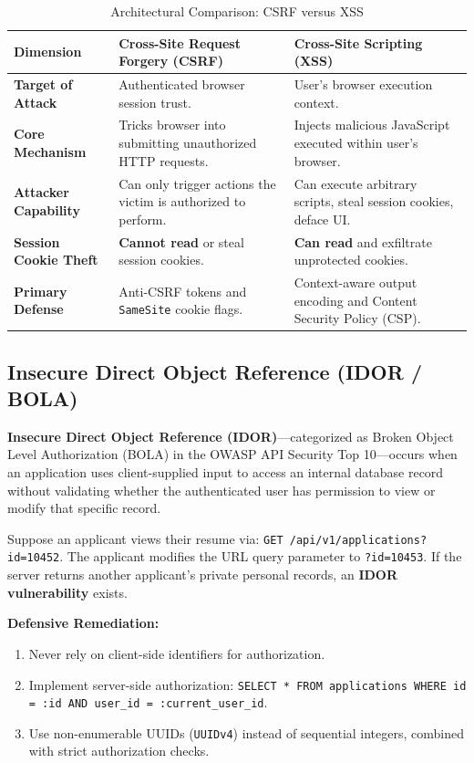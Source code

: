 \begin{table}[htbp]
\centering
\caption{Architectural Comparison: CSRF versus XSS}
\label{tab:csrf_vs_xss}
\begin{tabularx}{\textwidth}{p{3.2cm} X X}
\toprule
\textbf{Dimension} & \textbf{Cross-Site Request Forgery (CSRF)} & \textbf{Cross-Site Scripting (XSS)} \\
\midrule
\textbf{Target of Attack} & Authenticated browser session trust. & User's browser execution context. \\
\textbf{Core Mechanism} & Tricks browser into submitting unauthorized HTTP requests. & Injects malicious JavaScript executed within user's browser. \\
\textbf{Attacker Capability} & Can only trigger actions the victim is authorized to perform. & Can execute arbitrary scripts, steal session cookies, deface UI. \\
\textbf{Session Cookie Theft} & \textbf{Cannot read} or steal session cookies. & \textbf{Can read} and exfiltrate unprotected cookies. \\
\textbf{Primary Defense} & Anti-CSRF tokens and \texttt{SameSite} cookie flags. & Context-aware output encoding and Content Security Policy (CSP). \\
\bottomrule
\end{tabularx}
\end{table}

\subsection{Insecure Direct Object Reference (IDOR / BOLA)}

\textbf{Insecure Direct Object Reference (IDOR)}—categorized as Broken Object Level Authorization (BOLA) in the OWASP API Security Top 10—occurs when an application uses client-supplied input to access an internal database record without validating whether the authenticated user has permission to view or modify that specific record.

\begin{tcolorbox}[colback=white,colframe=black,title=\textbf{Concrete Examination Scenario: IDOR in a Job Application Portal}]
Suppose an applicant views their resume via: \texttt{GET /api/v1/applications?id=10452}.
The applicant modifies the URL query parameter to \texttt{?id=10453}. If the server returns another applicant's private personal records, an \textbf{IDOR vulnerability} exists.

\textbf{Defensive Remediation:}
\begin{enumerate}
\item Never rely on client-side identifiers for authorization.
\item Implement server-side authorization: \texttt{SELECT * FROM applications WHERE id = :id AND user\_id = :current\_user\_id}.
\item Use non-enumerable UUIDs (\texttt{UUIDv4}) instead of sequential integers, combined with strict authorization checks.
\end{enumerate}
\end{tcolorbox}

